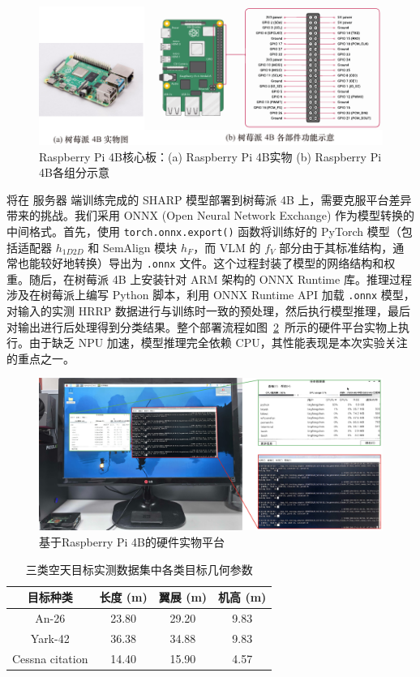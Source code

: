 \begin{figure}[h!]
\centering
\includegraphics[width=\linewidth]{figures/pi.pdf}
\caption{Raspberry Pi 4B核心板：(a) Raspberry Pi 4B实物 (b) Raspberry Pi 4B各组分示意} 
\label{fig:pi} 
\end{figure}

将在 服务器 端训练完成的 SHARP 模型部署到树莓派 4B 上，需要克服平台差异带来的挑战。我们采用 ONNX (Open Neural Network Exchange) 作为模型转换的中间格式。首先，使用 \texttt{torch.onnx.export()} 函数将训练好的 PyTorch 模型（包括适配器 $h_{1D2D}$ 和 SemAlign 模块 $h_F$，而 VLM 的 $f_V$ 部分由于其标准结构，通常也能较好地转换）导出为 \texttt{.onnx} 文件。这个过程封装了模型的网络结构和权重。随后，在树莓派 4B 上安装针对 ARM 架构的 ONNX Runtime 库。推理过程涉及在树莓派上编写 Python 脚本，利用 ONNX Runtime API 加载 \texttt{.onnx} 模型，对输入的实测 HRRP 数据进行与训练时一致的预处理，然后执行模型推理，最后对输出进行后处理得到分类结果。整个部署流程如图~\ref{fig:4b}~所示的硬件平台实物上执行。由于缺乏 NPU 加速，模型推理完全依赖 CPU，其性能表现是本次实验关注的重点之一。

\begin{figure}[h!]
\centering
\includegraphics[width=\linewidth]{figures/4b.jpg}
\caption{基于Raspberry Pi 4B的硬件实物平台} 
\label{fig:4b} 
\end{figure}

\begin{table}[h]
\centering
\caption{三类空天目标实测数据集中各类目标几何参数}
\label{tab:flights_measured}
\begin{tabular}{c c c c}
\toprule
\textbf{目标种类} & \textbf{长度 (m)} & \textbf{翼展 (m)} & \textbf{机高 (m)}\\
\midrule
An-26 & 23.80 & 29.20 & 9.83 \\
Yark-42 & 36.38 & 34.88 & 9.83 \\
Cessna citation & 14.40 & 15.90 & 4.57 \\
\bottomrule
\end{tabular}
\end{table}

